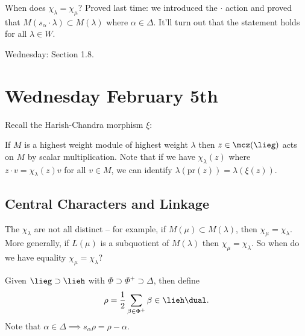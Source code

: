 When does \(\chi_\lambda = \chi_\mu\)? Proved last time: we introduced
the \(\cdot\) action and proved that
\(M(s_\alpha \cdot \lambda) \subset M(\lambda)\) where
\(\alpha \in \Delta\). It'll turn out that the statement holds for all
\(\lambda \in W\).

Wednesday: Section 1.8.

\hypertarget{wednesday-february-5th}{%
\section{Wednesday February 5th}\label{wednesday-february-5th}}

Recall the Harish-Chandra morphism \(\xi\):

\begin{center}
\end{center}

If \(M\) is a highest weight module of highest weight \(\lambda\) then
\(z\in \mcz(\lieg)\) acts on \(M\) by scalar multiplication. Note that
if we have \(\chi_\lambda(z)\) where \(z\cdot v = \chi_\lambda(z) v\)
for all \(v\in M\), we can identify
\(\lambda(\mathrm{pr}(z)) = \lambda(\xi(z))\).

\hypertarget{central-characters-and-linkage}{%
\subsection{Central Characters and
Linkage}\label{central-characters-and-linkage}}

The \(\chi_\lambda\) are not all distinct -- for example, if
\(M(\mu) \subset M(\lambda)\), then \(\chi_\mu = \chi_\lambda\). More
generally, if \(L(\mu)\) is a subquotient of \(M(\lambda)\) then
\(\chi_\mu = \chi_\lambda\). So when do we have equality
\(\chi_\mu = \chi_\lambda\)?

Given \(\lieg \supset \lieh\) with
\(\Phi \supset \Phi^+ \supset \Delta\), then define
\begin{align*}\rho = \frac 1 2 \sum_{\beta \in \Phi^+} \beta \in \lieh\dual.\end{align*}
Note that \(\alpha \in \Delta \implies s_\alpha \rho = \rho - \alpha\).

